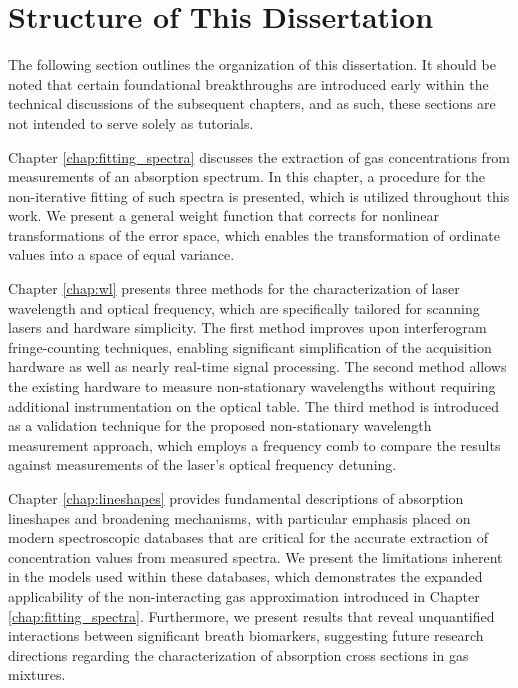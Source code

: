 \documentclass[8pt,a4paper]{report}
\begin{document}
	\section{Structure of This Dissertation}
	The following section outlines the organization of this dissertation. It should be noted that certain foundational breakthroughs are introduced early within the technical discussions of the subsequent chapters, and as such, these sections are not intended to serve solely as tutorials.%
	
	Chapter \ref{chap:fitting_spectra} discusses the extraction of gas concentrations from measurements of an absorption spectrum. In this chapter, a procedure for the non-iterative fitting of such spectra is presented, which is utilized throughout this work. We present a general weight function that corrects for nonlinear transformations of the error space, which enables the transformation of ordinate values into a space of equal variance.
	
	Chapter \ref{chap:wl} presents three methods for the characterization of laser wavelength and optical frequency, which are specifically tailored for scanning lasers and hardware simplicity. The first method improves upon interferogram fringe-counting techniques, enabling significant simplification of the acquisition hardware as well as nearly real-time signal processing. The second method allows the existing hardware to measure non-stationary wavelengths without requiring additional instrumentation on the optical table. The third method is introduced as a validation technique for the proposed non-stationary wavelength measurement approach, which employs a frequency comb to compare the results against measurements of the laser's optical frequency detuning.
	
	Chapter \ref{chap:lineshapes} provides fundamental descriptions of absorption lineshapes and broadening mechanisms, with particular emphasis placed on modern spectroscopic databases that are critical for the accurate extraction of concentration values from measured spectra. We present the limitations inherent in the models used within these databases, which demonstrates the expanded applicability of the non-interacting gas approximation introduced in Chapter \ref{chap:fitting_spectra}. Furthermore, we present results that reveal unquantified interactions between significant breath biomarkers, suggesting future research directions regarding the characterization of absorption cross sections in gas mixtures.
	
\end{document}
